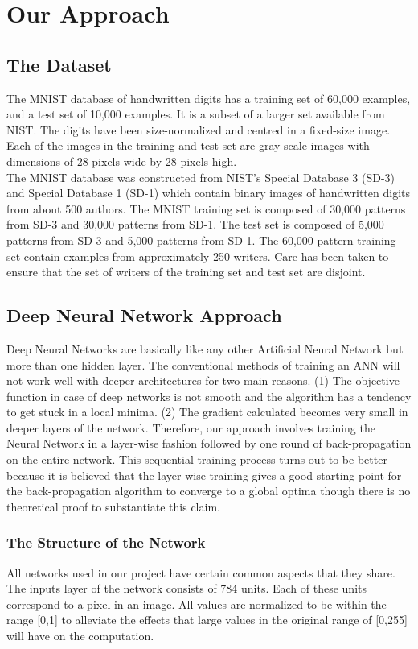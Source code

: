 \documentclass[10pt,twocolumn,letterpaper]{article}
\begin{document}
\section{Our Approach}
\subsection{The Dataset}
The MNIST database of handwritten digits has a training set of 60,000 examples, and a test set of 10,000 examples. It is a subset of a larger set available from NIST. The digits have been size-normalized and centred in a fixed-size image. Each of the images in the training and test set are gray scale images with dimensions of 28 pixels wide by 28 pixels high.\\

The MNIST database was constructed from NIST's Special Database 3 (SD-3) and Special Database 1 (SD-1) which contain binary images of handwritten digits from about 500 authors. The MNIST training set is composed of 30,000 patterns from SD-3 and 30,000 patterns from SD-1. The test set is composed of 5,000 patterns from SD-3 and 5,000 patterns from SD-1. The 60,000 pattern training set contain examples from approximately 250 writers. Care has been taken to ensure that the set of writers of the training set and test set are disjoint.

\subsection{Deep Neural Network Approach}
Deep Neural Networks are basically like any other Artificial Neural Network but more than one hidden layer. The conventional methods of training an ANN will not work well with deeper architectures for two main reasons. (1) The objective function in case of deep networks is not smooth and the algorithm has a tendency to get stuck in a local minima. (2) The gradient calculated becomes very small in deeper layers of the network. Therefore, our approach involves  training the Neural Network in a layer-wise fashion followed by one round of back-propagation on the entire network. This sequential training process turns out to be better because it is believed that the layer-wise training gives a good starting point for the back-propagation algorithm to converge to a global optima though there is no theoretical proof to substantiate this claim.

\subsubsection{The Structure of the Network}
All networks used in our project have certain common aspects that they share. The inputs layer of the network consists of 784 units. Each of these units correspond to a pixel in an image. All values are normalized to be within the range [0,1] to alleviate the effects that large values in the original range of [0,255] will have on the computation.\\
\end{document}
